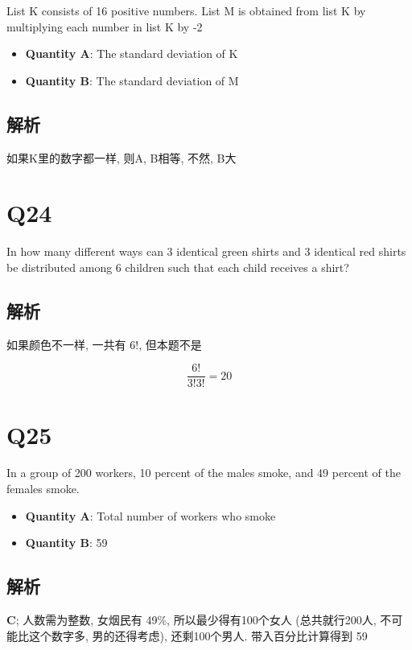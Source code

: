   List K consists of 16 positive numbers. List M is obtained from list K by
  multiplying each number in list K by -2

  \begin{itemize}
    \item \textbf{Quantity A}: The standard deviation of K
    \item \textbf{Quantity B}: The standard deviation of M
  \end{itemize}

  \subsection{解析}

    如果K里的数字都一样, 则A, B相等, 不然, B大

\section{Q24}

  In how many different ways can 3 identical green shirts and 3 identical
  red shirts be distributed among 6 children such that each child receives
  a shirt?

  \subsection{解析}

    如果颜色不一样, 一共有 $ 6! $, 但本题不是

    \begin{equation*}
      \frac{6!}{3! 3!} = 20
    \end{equation*}

\section{Q25}

  In a group of 200 workers, 10 percent of the males smoke, and 49 percent
  of the females smoke.

  \begin{itemize}
    \item \textbf{Quantity A}: Total number of workers who smoke
    \item \textbf{Quantity B}: 59
  \end{itemize}

  \subsection{解析}

    \textbf{C}; 人数需为整数, 女烟民有 49\%, 所以最少得有100个女人 (总共就行200人,
    不可能比这个数字多, 男的还得考虑), 还剩100个男人. 带入百分比计算得到 59
